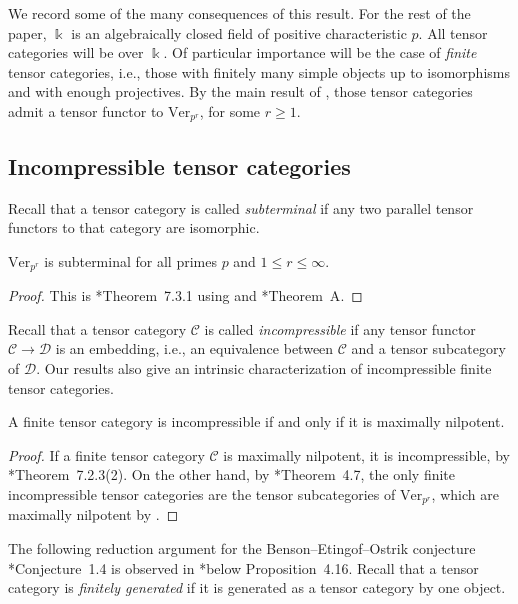 \documentclass[11pt,oneside]{amsart}
\theoremstyle{definition}
\theoremstyle{remark}
\numberwithin{equation}{section}
\newcommand\cC{\mathcal C}
\newcommand\cD{\mathcal D}
\newcommand\Ver{\mathrm{Ver}}
\renewcommand\:\colon
\newcommand\kk{\Bbbk}
\begin{document}
We record some of the many consequences of this result. For the rest of the paper, $\kk$ is an algebraically closed field of positive characteristic $p$. All tensor categories will be over $\kk$. Of particular importance will be the case of \emph{finite} tensor categories, i.e., those with finitely many simple objects up to isomorphisms and with enough projectives. By the main result of \cite{CF-beo}, those tensor categories admit a tensor functor to $\Ver_{p^r}$, for some $r\ge1$.

\subsection{Incompressible tensor categories} \label{sec:incompressible}

Recall that a tensor category is called \emph{subterminal} if any two parallel tensor functors to that category are isomorphic.

\begin{proposition} \label{prop:subterminal} $\Ver_{p^r}$ is subterminal for all primes $p$ and $1\le r\le\infty$.
\end{proposition}

\begin{proof}
This is \cite{CEO-incompressible}*{Theorem~7.3.1} using  and \cite{Cou-gr}*{Theorem~A}.
\end{proof}

Recall that a tensor category $\cC$ is called \emph{incompressible} if any tensor functor $\cC\to\cD$ is an embedding, i.e., an equivalence between $\cC$ and a tensor subcategory of $\cD$. Our results also give an intrinsic characterization of incompressible finite tensor categories.

\begin{proposition} \label{prop:incompressible} A finite tensor category is incompressible if and only if it is maximally nilpotent.
\end{proposition}

\begin{proof}
    If a finite tensor category $\cC$ is maximally nilpotent, it is incompressible, by \cite{CEO-incompressible}*{Theorem~7.2.3(2)}. On the other hand, by \cite{CF-beo}*{Theorem~4.7}, the only finite incompressible tensor categories are the tensor subcategories of $\Ver_{p^r}$, which are maximally nilpotent by .
\end{proof}

The following reduction argument for the Benson--Etingof--Ostrik conjecture \cite{BEO}*{Conjecture~1.4} is observed in \cite{CF-beo}*{below Proposition~4.16}. Recall that a tensor category is \emph{finitely generated} if it is generated as a tensor category by one object.
\end{document}
